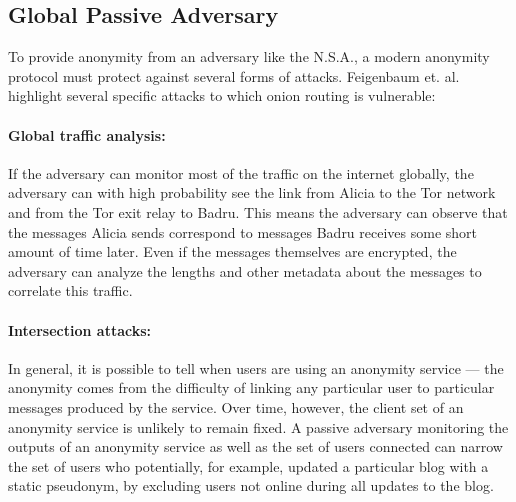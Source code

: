   \subsection{Global Passive Adversary}
    To provide anonymity from an adversary like the N.S.A., a modern anonymity
    protocol must protect against several forms of attacks. Feigenbaum et.
    al.\cite{feigenbaum_seeking_2013} highlight several specific attacks to
    which onion routing is vulnerable:
    \paragraph{Global traffic analysis:}
    If the adversary can monitor most of the traffic on the internet globally,
    the adversary can with high probability see the link from Alicia to the Tor
    network and from the Tor exit relay to Badru. This means the adversary can
    observe that the messages Alicia sends correspond to messages Badru receives
    some short amount of time later. Even if the messages themselves are
    encrypted, the adversary can analyze the lengths and other metadata about
    the messages to correlate this traffic.
    \paragraph{Intersection attacks:}
    In general, it is possible to tell when users are using an anonymity service
    --- the anonymity comes from the difficulty of linking any particular user
    to particular messages produced by the service. Over time, however, the
    client set of an anonymity service is unlikely to remain fixed. A passive
    adversary monitoring the outputs of an anonymity service as well as the set
    of users connected can narrow the set of users who potentially, for example,
    updated a particular blog with a static pseudonym, by excluding users  not
    online during all updates to the blog.


